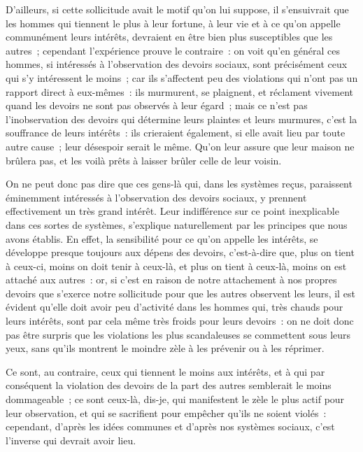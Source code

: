 \documentclass[french,twoside]{book} %
\begin{document}
D’ailleurs, si cette sollicitude avait le motif qu’on lui suppose, il s’ensuivrait que les hommes qui tiennent le plus à leur fortune, à leur vie et à ce qu’on appelle communément leurs intérêts, devraient en être bien plus susceptibles que les autres ; cependant l’expérience prouve le contraire : on voit qu’en général ces hommes, si intéressés à l’observation des devoirs sociaux, sont précisément ceux qui s’y intéressent le moins ; car ils s’affectent peu des violations qui n’ont pas un rapport direct à eux-mêmes : ils murmurent, se plaignent, et réclament vivement quand les devoirs ne sont pas observés à leur égard ; mais ce n’est pas l’inobservation des devoirs qui détermine leurs plaintes et leurs murmures, c’est la souffrance de leurs intérêts : ils crieraient également, si elle avait lieu par toute autre cause ; leur désespoir serait le même. Qu’on leur assure que leur maison ne brûlera pas, et les voilà prêts à laisser brûler celle de leur voisin.\par
On ne peut donc pas dire que ces gens-là qui, dans les systèmes reçus, paraissent éminemment intéressés à l’observation des devoirs sociaux, y prennent effectivement un très grand intérêt. Leur indifférence sur ce point inexplicable dans ces sortes de systèmes, s’explique naturellement par les principes que nous avons établis. En effet, la sensibilité pour ce qu’on appelle les intérêts, se développe presque toujours aux dépens des devoirs, c’est-à-dire que, plus on tient à ceux-ci, moins on doit tenir à ceux-là, et plus on tient à ceux-là, moins on est attaché aux autres : or, si c’est en raison de notre attachement à nos propres devoirs que s’exerce notre sollicitude pour que les autres observent les leurs, il est évident qu’elle doit avoir peu d’activité dans les hommes qui, très chauds pour leurs intérêts, sont par cela même très froids pour leurs devoirs : on ne doit donc pas être surpris que les violations les plus scandaleuses se commettent sous leurs yeux, sans qu’ils montrent le moindre zèle à les prévenir ou à les réprimer.\par
Ce sont, au contraire, ceux qui tiennent le moins aux intérêts, et à qui par conséquent la violation des devoirs de la part des autres semblerait le moins dommageable ; ce sont ceux-là, dis-je, qui manifestent le zèle le plus actif pour leur observation, et qui se sacrifient pour empêcher qu’ils ne soient violés : cependant, d’après les idées communes et d’après nos systèmes sociaux, c’est l’inverse qui devrait avoir lieu.\par
\end{document}

